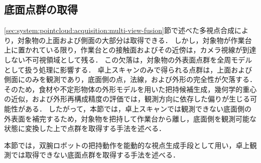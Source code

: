




\subsection{底面点群の取得}
\label{sec:system:bottom_acquisition}

\ref{sec:system:pointcloud:acquisition:multi-view-fusion}節で述べた多視点合成により，対象物の上面および側面の大部分は取得できる．
しかし，対象物が作業台上に置かれている限り，作業台との接触面およびその近傍は，カメラ視線が到達しない不可視領域として残る．
この欠落は，対象物の外表面点群を全周モデルとして扱う処理に影響する．
卓上スキャンのみで得られる点群は，上面および側面にのみを観測であり，底面側の点，法線，および外形の完全性が欠落する．
そのため，食材や不定形物体の外形モデルを用いた把持候補生成，幾何学的重心の近似，および外形再構成精度の評価では，観測方向に依存した偏りが生じる可能性がある．
したがって，本節では，卓上スキャンでは観測できない底面側の外表面を補完するため，対象物を把持して作業台から離し，底面側を観測可能な状態に変換した上で点群を取得する手法を述べる．

本節では，双腕ロボットの把持動作を能動的な視点生成手段として用い，卓上観測では取得できない底面点群を取得する手法を述べる．


